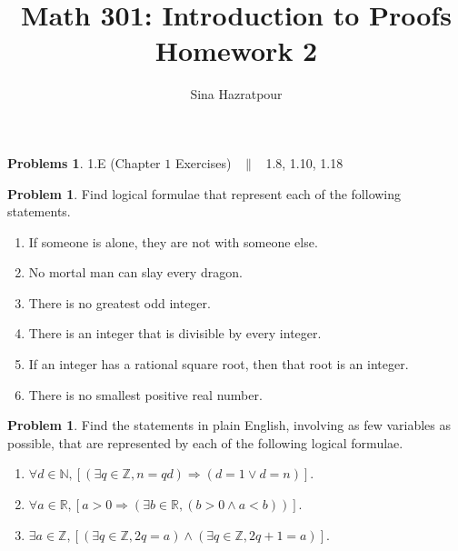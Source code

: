 \documentclass[12pt,english]{amsart}
\title{Math 301: Introduction to Proofs\\
Homework 2}
\author[]{Sina Hazratpour}
\theoremstyle{plain}
\theoremstyle{definition}
\theoremstyle{plain}
\theoremstyle{plain}
\theoremstyle{remark}
\newcounter{problems}
\theoremstyle{definition}
\newtheorem{problem}[problems]{Problem}
\newtheorem*{pbs}{Problems}
\theoremstyle{remark}
\newtheorem*{solution}{Solution}
\begin{document}
\maketitle


\begin{pbs}\leavevmode 

\textsection 1.E (Chapter $1$ Exercises) \, $ \| $ \,  1.8, 1.10, 1.18 
\end{pbs}



\begin{problem}
	Find logical formulae that represent each of the following statements.
	\begin{enumerate}
	    \item If someone is alone, they are not with someone else.
	    \item No mortal man can slay every dragon.
	    \item There is no greatest odd integer.
	    \item There is an integer that is divisible by every integer.
		\item If an integer has a rational square root, then that root is an integer.
	    \item There is no smallest positive real number.
	\end{enumerate}
\end{problem}






\begin{problem}
	Find the statements in plain English, involving as few variables as possible, that are represented by each of the following logical formulae.
	\begin{enumerate}
		\item $\forall d\in\mathbb{N},[(\exists q\in\mathbb{Z}, n=qd) \Rightarrow (d=1 \vee d=n)]$.
		
			
		
		\item $\forall a\in\mathbb{R}, [a>0\Rightarrow (\exists b\in\mathbb{R},(b>0\wedge a<b))]$.
		
			
		
		\item $\exists a\in \mathbb{Z}, [(\exists q\in \mathbb{Z}, 2q=a) \wedge (\exists q\in \mathbb{Z}, 2q+1=a)]$.
		
			
		
	\end{enumerate}
\end{problem}
\end{document}

